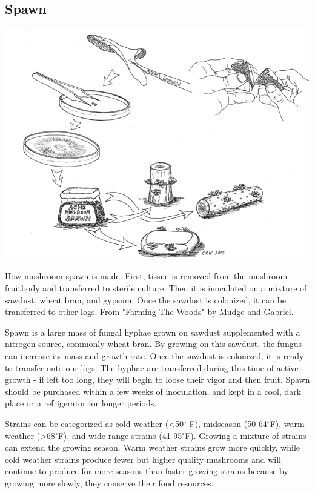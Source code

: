 \documentclass{tufte-handout}
\begin{document}
\subsection{Spawn}

\begin{marginfigure}
\includegraphics{shiitake-spawn}
\caption{How mushroom spawn is made. First, tissue is removed from the mushroom fruitbody and transferred to  sterile culture. Then it is inoculated on a mixture of sawdust, wheat bran, and gypsum. Once the sawdust is colonized, it can be transferred to other logs. From "Farming The Woods" by Mudge and Gabriel.}
\end{marginfigure}

Spawn is a large mass of fungal hyphae grown on sawdust supplemented with a nitrogen source, commonly wheat bran. 
By growing on this sawdust, the fungus can increase its mass and growth rate. Once the sawdust is colonized, it is ready to transfer onto our logs.
The hyphae are transferred during this time of active growth  - if left too long, they will begin to loose their vigor and then fruit. 
Spawn should be purchased within a few weeks of inoculation, and kept in a cool, dark place or a refrigerator for longer periods. 

Strains can be categorized as cold-weather (<50$^{\circ}$ F), midseason (50-64$^{\circ}$F), warm-weather (>68$^{\circ}$F), and wide range strains (41-95$^{\circ}$F). 
Growing a mixture of strains can extend the growing season. 
Warm weather strains grow more quickly, while cold weather strains produce fewer but higher quality mushrooms and will continue to produce for more seasons than faster growing strains because by growing more slowly, they conserve their food resources.
\end{document}

